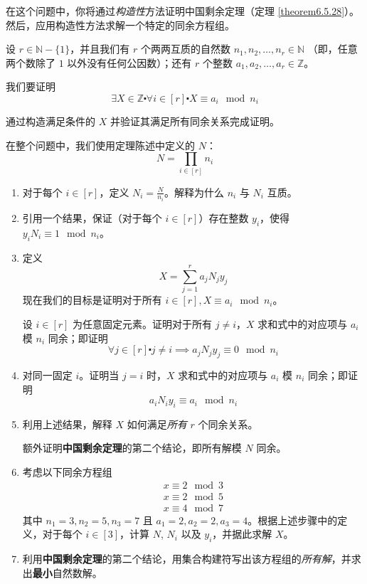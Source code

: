 \begin{exercise}\label{exc:exercises6.7.27}
    \indent 在这个问题中，你将通过\emph{构造性}方法证明中国剩余定理（定理 \ref{theorem6.5.28}）。然后，应用构造性方法求解一个特定的同余方程组。

    设 $r \in \mathbb{N} - \{1\}$，并且我们有 $r$ 个两两互质的自然数 $n_1, n_2, \dots , n_r \in \mathbb{N}$ （即，任意两个数除了 $1$ 以外没有任何公因数）；还有 $r$ 个整数 $a_1, a_2, \dots , a_r \in \mathbb{Z}$。

    我们要证明
    \[\exists X \in \mathbb{Z} \centerdot \forall i \in [r] \centerdot X \equiv a_i \mod n_i\]

    通过构造满足条件的 $X$ 并验证其满足所有同余关系完成证明。

    在整个问题中，我们使用定理陈述中定义的 $N$：
    \[N = \prod_{i \in [r]} n_i\]
    \begin{enumerate}[label=(\alph*)]
        \item 对于每个 $i \in [r]$，定义 $N_i = \frac{N}{n_i}$。解释为什么 $n_i$ 与 $N_i$ 互质。
        \item 引用一个结果，保证（对于每个 $i \in [r]$）存在整数 $y_i$，使得 $y_iN_i \equiv 1 \mod n_i$。
        \item 定义
            \[X = \sum_{j=1}^{r} a_jN_jy_j\]
            现在我们的目标是证明对于所有 $i \in [r], X \equiv a_i \mod n_i$。

            设 $i \in [r]$ 为任意固定元素。证明对于所有 $j \ne i$，$X$ 求和式中的对应项与 $a_i$ 模 $n_i$ 同余；即证明
            \[\forall j \in [r] \centerdot j \ne i \implies a_jN_jy_j \equiv 0 \mod n_i\]
        \item 对同一固定 $i$。证明当 $j = i$ 时，$X$ 求和式中的对应项与 $a_i$ 模 $n_i$ 同余；即证明
            \[a_iN_iy_i \equiv a_i \mod n_i\]
        \item 利用上述结果，解释 $X$ 如何满足\emph{所有} $r$ 个同余关系。
        
        \begin{center}
            额外证明\textbf{中国剩余定理}的第二个结论，即所有解模 $N$ 同余。
        \end{center}

        \item 考虑以下同余方程组
            \begin{align*}
                x \equiv 2 \mod 3 \\
                x \equiv 2 \mod 5 \\
                x \equiv 4 \mod 7
            \end{align*}
            其中 $n_1 = 3, n_2 = 5, n_3 = 7$ 且 $a_1 = 2, a_2 = 2, a_3 = 4$。根据上述步骤中的定义，对于每个 $i \in [3]$，计算 $N$, $N_i$ 以及 $y_i$，并据此求解 $X$。
        \item 利用\textbf{中国剩余定理}的第二个结论，用集合构建符写出该方程组的\emph{所有解}，并求出\textbf{最小}自然数解。
    \end{enumerate}
\end{exercise}

